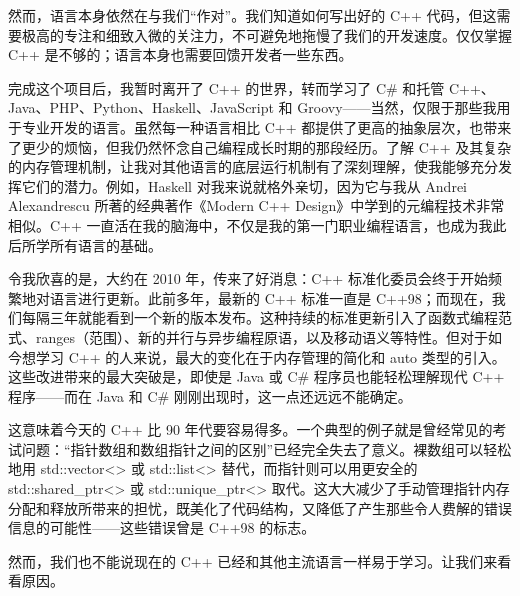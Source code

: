 然而，语言本身依然在与我们“作对”。我们知道如何写出好的 C++ 代码，但这需要极高的专注和细致入微的关注力，不可避免地拖慢了我们的开发速度。仅仅掌握 C++ 是不够的；语言本身也需要回馈开发者一些东西。

完成这个项目后，我暂时离开了 C++ 的世界，转而学习了 C\# 和托管 C++、Java、PHP、Python、Haskell、JavaScript 和 Groovy——当然，仅限于那些我用于专业开发的语言。虽然每一种语言相比 C++ 都提供了更高的抽象层次，也带来了更少的烦恼，但我仍然怀念自己编程成长时期的那段经历。了解 C++ 及其复杂的内存管理机制，让我对其他语言的底层运行机制有了深刻理解，使我能够充分发挥它们的潜力。例如，Haskell 对我来说就格外亲切，因为它与我从 Andrei Alexandrescu 所著的经典著作《Modern C++ Design》中学到的元编程技术非常相似。C++ 一直活在我的脑海中，不仅是我的第一门职业编程语言，也成为我此后所学所有语言的基础。

令我欣喜的是，大约在 2010 年，传来了好消息：C++ 标准化委员会终于开始频繁地对语言进行更新。此前多年，最新的 C++ 标准一直是 C++98；而现在，我们每隔三年就能看到一个新的版本发布。这种持续的标准更新引入了函数式编程范式、ranges（范围）、新的并行与异步编程原语，以及移动语义等特性。但对于如今想学习 C++ 的人来说，最大的变化在于内存管理的简化和 auto 类型的引入。这些改进带来的最大突破是，即使是 Java 或 C\# 程序员也能轻松理解现代 C++ 程序——而在 Java 和 C\# 刚刚出现时，这一点还远远不能确定。

这意味着今天的 C++ 比 90 年代要容易得多。一个典型的例子就是曾经常见的考试问题：“指针数组和数组指针之间的区别”已经完全失去了意义。裸数组可以轻松地用 std::vector<> 或 std::list<> 替代，而指针则可以用更安全的 std::shared\_ptr<> 或 std::unique\_ptr<> 取代。这大大减少了手动管理指针内存分配和释放所带来的担忧，既美化了代码结构，又降低了产生那些令人费解的错误信息的可能性——这些错误曾是 C++98 的标志。

然而，我们也不能说现在的 C++ 已经和其他主流语言一样易于学习。让我们来看看原因。
























